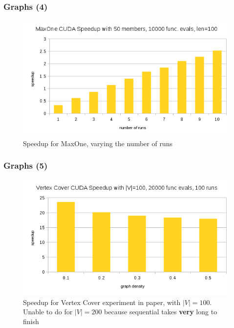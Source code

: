 \documentclass{beamer}
\begin{document}
	\begin{frame}
		\frametitle{Graphs (4)}
		\begin{figure}[t]
  			\centering
  			\includegraphics[width=.9\textwidth]{maxone_change_runs.png}
  			\caption{Speedup for MaxOne, varying the number of runs}
		\end{figure}
	\end{frame}
	\begin{frame}
		\frametitle{Graphs (5)}
		\begin{figure}[t]
  			\centering
  			\includegraphics[width=.9\textwidth]{khuri_exper_100.png}
  			\caption{Speedup for Vertex Cover experiment in paper, with $|V|=100$. Unable to do for $|V|=200$ because sequential takes \textbf{very} long to finish}
		\end{figure}
	\end{frame}
\end{document}
